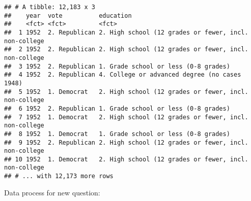 \documentclass[
]{article}
\newenvironment{Shaded}{\begin{snugshade}}{\end{snugshade}}
\newcommand{\DataTypeTok}[1]{\textcolor[rgb]{0.13,0.29,0.53}{#1}}
\newcommand{\KeywordTok}[1]{\textcolor[rgb]{0.13,0.29,0.53}{\textbf{#1}}}
\newcommand{\NormalTok}[1]{#1}
\newcommand{\OperatorTok}[1]{\textcolor[rgb]{0.81,0.36,0.00}{\textbf{#1}}}
\newcommand{\StringTok}[1]{\textcolor[rgb]{0.31,0.60,0.02}{#1}}
\begin{document}
\begin{Shaded}
\end{Shaded}

\begin{verbatim}
## # A tibble: 12,183 x 3
##    year  vote          education                                            
##    <fct> <fct>         <fct>                                                
##  1 1952  2. Republican 2. High school (12 grades or fewer, incl. non-college
##  2 1952  2. Republican 2. High school (12 grades or fewer, incl. non-college
##  3 1952  2. Republican 1. Grade school or less (0-8 grades)                 
##  4 1952  2. Republican 4. College or advanced degree (no cases 1948)        
##  5 1952  1. Democrat   2. High school (12 grades or fewer, incl. non-college
##  6 1952  2. Republican 1. Grade school or less (0-8 grades)                 
##  7 1952  1. Democrat   2. High school (12 grades or fewer, incl. non-college
##  8 1952  1. Democrat   1. Grade school or less (0-8 grades)                 
##  9 1952  2. Republican 2. High school (12 grades or fewer, incl. non-college
## 10 1952  1. Democrat   2. High school (12 grades or fewer, incl. non-college
## # ... with 12,173 more rows
\end{verbatim}

\begin{Shaded}
\end{Shaded}

Data process for new question:
\end{document}
